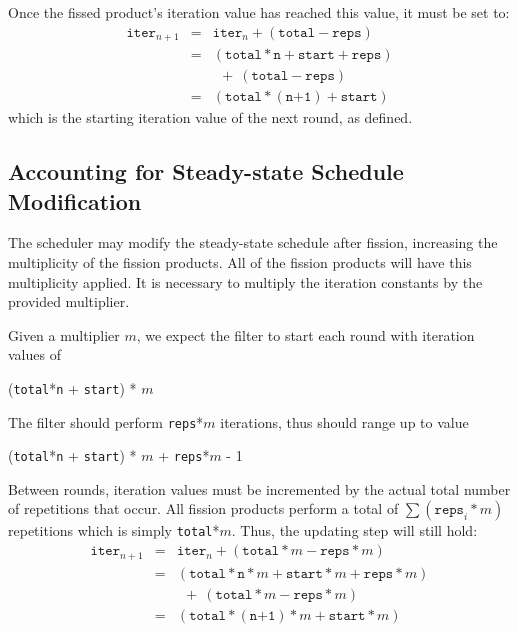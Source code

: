 Once the fissed product's iteration value has reached
this value, it must be set to:
\begin{eqnarray*}
\texttt{iter}_{n+1} &=& \texttt{iter}_{n} + (\texttt{total} - \texttt{reps}) \\
&=& (\texttt{total}*\texttt{n} + \texttt{start} + \texttt{reps}) \\
&&  \ \ +\ (\texttt{total} - \texttt{reps}) \\
&=& (\texttt{total}*(\texttt{n+1}) + \texttt{start})
\end{eqnarray*}
which is the starting iteration value of the next round, as defined.

\subsection{Accounting for Steady-state Schedule Modification}

The scheduler may modify the steady-state schedule after fission, increasing the multiplicity of the fission products.  All of the fission products will have this multiplicity applied. It is necessary to multiply the iteration constants by the provided multiplier.

Given a multiplier $m$, we expect the filter to start each round with iteration values of 
\begin{center}
(\texttt{total}*\texttt{n} + \texttt{start}) * $m$
\end{center}
The filter should perform \texttt{reps}*$m$ iterations, thus should range up to value
\begin{center}
(\texttt{total}*\texttt{n} + \texttt{start}) * $m$ + \texttt{reps}*$m$ - 1
\end{center}

Between rounds, iteration values must be incremented by the actual total number of repetitions that occur.  All fission products perform a total of $\sum(\texttt{reps}_{i}*m)$ repetitions which is simply \texttt{total}*$m$.  Thus, the updating step will still hold:
\begin{eqnarray*}
\texttt{iter}_{n+1} &=& \texttt{iter}_{n} + (\texttt{total}*m - \texttt{reps}*m) \\
&=& (\texttt{total}*\texttt{n}*m + \texttt{start}*m + \texttt{reps}*m) \\
&&  \ \ +\ (\texttt{total}*m - \texttt{reps}*m) \\
&=& (\texttt{total}*(\texttt{n+1})*m + \texttt{start}*m)
\end{eqnarray*}
